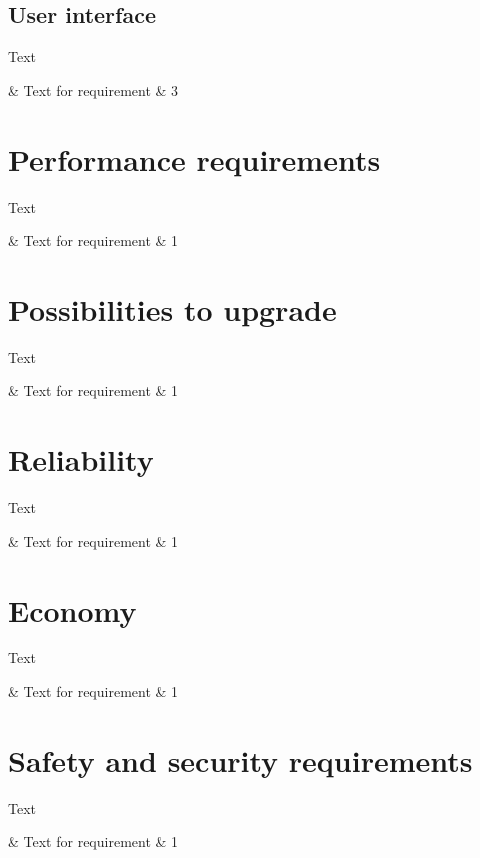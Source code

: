 \documentclass[10pt,oneside,english]{lips}
\begin{document}
\subsection{User interface}
Text
\begin{requirements}
  \requirementno & Text for requirement & 3\\
\end{requirements}

\section{Performance requirements}
Text
\begin{requirements}
  \requirementno & Text for requirement & 1\\
\end{requirements}

\section{Possibilities to upgrade}
Text
\begin{requirements}
  \requirementno & Text for requirement & 1\\
\end{requirements}

\section{Reliability}
Text
\begin{requirements}
  \requirementno & Text for requirement & 1\\
\end{requirements}

\section{Economy} 
Text
\begin{requirements}
  \requirementno & Text for requirement & 1\\
\end{requirements}

\section{Safety and security requirements}
Text
\begin{requirements}
  \requirementno & Text for requirement & 1\\
\end{requirements}
\end{document}
